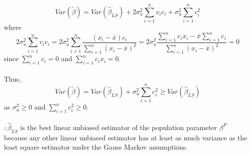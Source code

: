\documentclass[11pt,letterhead]{article}
\begin{document}
$$Var(\tilde{\beta})=Var(\hat{\beta}_{LS})+2\sigma_u^2\sum_{i=1}^n v_i c_i + \sigma_u^2\sum_{i=1}^n c_i^2$$
where $$2\sigma_u^2\sum_{i=1}^n v_i c_i=2\sigma_u^2\sum_{i=1}^n \frac{(x_i-\bar{x})c_i}{\sum_{i=1}^n (x_i-\bar{x})^2}=2\sigma_u^2\frac{\sum_{i=1}^n c_i x_i -\bar{x}\sum_{i=1}^nc_i}{\sum_{i=1}^n (x_i-\bar{x})^2}=0$$ since $\sum_{i=1}^n c_i=0$ and $\sum_{i=1}^n c_i x_i=0$.\\~\\
Thus, $$Var(\tilde{\beta})=Var(\hat{\beta}_{LS}) + \sigma_u^2\sum_{i=1}^n c_i^2 \geq Var(\hat{\beta}_{LS})$$ as $\sigma_u^2 \geq 0$ and $\sum_{i=1}^n c_i^2 \geq 0$.\\~\\
$\therefore \hat{\beta}_{LS}$ is the best linear unbiased estimator of the population parameter $\beta^P$ because any other linear unbiased estimator has at least as much variance as the least square estimator under the Gauss Markov assumptions.
\end{document}
